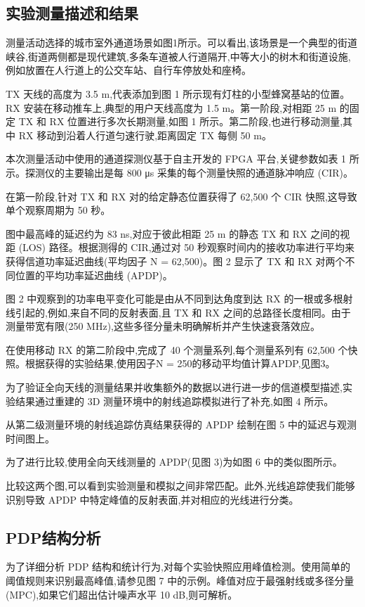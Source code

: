 \subsection{实验测量描述和结果}
测量活动选择的城市室外通道场景如图1所示。可以看出,该场景是一个典型的街道峡谷,街道两侧都是现代建筑,多条车道被人行道隔开,中等大小的树木和街道设施,例如放置在人行道上的公交车站、自行车停放处和座椅。

TX 天线的高度为 3.5 m,代表添加到图 1 所示现有灯柱的小型蜂窝基站的位置。RX 安装在移动推车上,典型的用户天线高度为 1.5 m。第一阶段,对相距 25 m 的固定 TX 和 RX 位置进行多次长期测量,如图 1 所示。第二阶段,也进行移动测量,其中 RX 移动到沿着人行道匀速行驶,距离固定 TX 每侧 50 m。

本次测量活动中使用的通道探测仪基于自主开发的 FPGA 平台,关键参数如表 1 所示。探测仪的主要输出是每 800 μs 采集的每个测量快照的通道脉冲响应 (CIR)。

在第一阶段,针对 TX 和 RX 对的给定静态位置获得了 62,500 个 CIR 快照,这导致单个观察周期为 50 秒。

图中最高峰的延迟约为 83 ns,对应于彼此相距 25 m 的静态 TX 和 RX 之间的视距 (LOS) 路径。根据测得的 CIR,通过对 50 秒观察时间内的接收功率进行平均来获得信道功率延迟曲线(平均因子 N = 62,500)。图 2 显示了 TX 和 RX 对两个不同位置的平均功率延迟曲线 (APDP)。

图 2 中观察到的功率电平变化可能是由从不同到达角度到达 RX 的一根或多根射线引起的,例如,来自不同的反射表面,且 TX 和 RX 之间的总路径长度相同。由于测量带宽有限(250 MHz),这些多径分量未明确解析并产生快速衰落效应。

在使用移动 RX 的第二阶段中,完成了 40 个测量系列,每个测量系列有 62,500 个快照。根据获得的实验结果,使用因子N = 250的移动平均值计算APDP,见图3。

为了验证全向天线的测量结果并收集额外的数据以进行进一步的信道模型描述,实验结果通过重建的 3D 测量环境中的射线追踪模拟进行了补充,如图 4 所示。

从第二级测量环境的射线追踪仿真结果获得的 APDP 绘制在图 5 中的延迟与观测时间图上。

为了进行比较,使用全向天线测量的 APDP(见图 3)为如图 6 中的类似图所示。

比较这两个图,可以看到实验测量和模拟之间非常匹配。此外,光线追踪使我们能够识别导致 APDP 中特定峰值的反射表面,并对相应的光线进行分类。

\subsection{PDP结构分析}
为了详细分析 PDP 结构和统计行为,对每个实验快照应用峰值检测。使用简单的阈值规则来识别最高峰值,请参见图 7 中的示例。峰值对应于最强射线或多径分量 (MPC),如果它们超出估计噪声水平 10 dB,则可解析。

